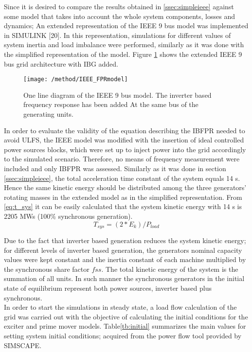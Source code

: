 Since it is desired to compare the results obtained in \ref{ssec:simpleieee} against some model that takes into account the whole system components, losses and dynamics; An  extended representation of the IEEE 9 bus model was implemented in SIMULINK [20]. In this representation, simulations for different values of system inertia and load imbalance were performed, similarly as it was done with the simplified representation of the model. Figure \ref{fig:ieeeext} shows the extended IEEE 9 bus grid architecture with IBG added.\\
\begin{figure}[h]
	\centering
	\texttt{[image: /method/IEEE\_FPRmodel]}
	\caption{One line diagram of the IEEE 9 bus model. The inverter based frequency response has been added At the same bus of the generating units.}
	\label{fig:ieeeext}
\end{figure}
In order to evaluate the validity of the equation describing the IBFPR needed to avoid ULFS, the IEEE model was modified with the insertion of ideal controlled power sources blocks, which were set up to inject power into the grid accordingly to the simulated scenario. Therefore, no means of frequency measurement were included and only IBFPR was assessed.
Similarly as it was done in section \ref{ssec:simpleieee}, the total acceleration time constant of the system equals 14 s. Hence the same kinetic energy should be distributed among the three generators' rotating masses in the extended model as in the simplified representation. From \eqref{eq:t_sys} it can be easily calculated that the system kinetic energy with 14 s is 2205 MWs (100\% synchronous generation).
\begin{equation}
	\label{eq:t_sys}
	T_{sys}=(2*E_{k})/P_{load}
\end{equation}
 
Due to the fact that inverter based generation reduces the system kinetic energy; for different levels of inverter based generation,  the generators nominal capacity values were kept constant and the inertia constant of each machine multiplied by the synchronous share factor $ fss $. The total kinetic energy of the system is the summation of all units. In such manner the synchronous generators in the initial state of equilibrium represent both power sources, inverter based plus synchronous.\\
In order to start the simulations in steady state, a load flow calculation of the grid was carried out with the objective of calculating the initial conditions for the exciter and prime mover models. 
Table\ref{tb:initial} summarizes the main values for setting system initial conditions; acquired from the power flow tool provided by SIMSCAPE.


